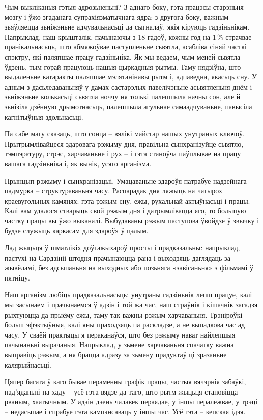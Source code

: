 Чым выкліканыя гэтыя адрозьненьні? З аднаго боку, гэта працэсы старэньня мозгу і ўжо згаданага супрахіязматычнага ядра; з другога боку, важным зьяўляецца зьніжэньне адчувальнасьці да сыгналаў, якія кіруюць гадзіньнікам. Напрыклад, наш крышталік, пачынаючы з 18 гадоў, кожны год на 1\,\% страчвае пранікальнасьць, што абмяжоўвае паступленьне сьвятла, асабліва сіняй часткі спэктру, які паляпшае працу гадзіньніка. Як мы ведаем, чым меней сьвятла ўдзень, тым горай працуюць нашыя цыркадныя рытмы. Таму нядзіўна, што выдаленьне катаракты паляпшае мэлятанінавы рытм і, адпаведна, якасьць сну. У адным з дасьледаваньняў у дамах састарэлых павелічэньне асьвятленьня днём і зьніжэньне колькасьці сьвятла ноччу ня толькі палепшыла начны сон, але й зьнізіла дзённую дрымотнасьць, палепшыла агульнае самаадчуваньне, павысіла кагнітыўныя здольнасьці.

Па сабе магу сказаць, што сонца – вялікі майстар нашых унутраных ключоў. Прытрымлівайцеся здаровага рэжыму дня, правільна сынхранізуйце сьвятло, тэмпэратуру, стрэс, харчаваньне і рух – і гэта станоўча паўплывае на працу вашага гадзіньніка і, як вынік, усяго арганізма.

Прынцып рэжыму і сынхранізацыі. Умацаваньне здароўя патрабуе надзейнага падмурка – структураваньня часу. Распарадак дня ляжыць на чатырох краевугольных камянях: гэта рэжым сну, ежы, рухальнай актыўнасьці і працы. Калі вам удалося стварыць свой рэжым дня і датрымлівацца яго, то большую частку працы вы ўжо выканалі. Выбудаваны рэжым паступова ўвойдзе ў звычку і будзе служыць каркасам для здароўя ў цэлым.

Лад жыцьця ў шматлікіх доўгажыхароў просты і прадказальны: напрыклад, пастухі на Сардзініі штодня прачынаюцца рана і выходзяць даглядаць за жывёламі, без адсыпаньня на выходных або позьняга «завісаньня» з фільмамі ў пятніцу.

Наш арганізм любіць прадказальнасьць: унутраны гадзіньнік лепш працуе, калі мы засынаем і прачынаемся ў адзін і той жа час, наш страўнік і кішачнік загадзя рыхтуюцца да прыёму ежы, таму так важны рэжым харчаваньня. Трэніроўкі больш эфэктыўныя, калі яны праходзяць па раскладзе, а не выпадкова час ад часу. У сваёй практыцы я пераканаўся, што без рэжыму нават найлепшыя пачынаньні вырачаныя. Напрыклад, у зьмене харчаваньня спачатку важна выправіць рэжым, а ня брацца адразу за зьмену прадуктаў ці зразаньне калярыйнасьці.

Цяпер багата ў каго бывае пераменны графік працы, частыя вячэрнія забаўкі, пад'яданьні на хаду – усё гэта вядзе да таго, што рытм жыцьця становіцца рваным, хаатычным. У адзін дзень чалавек пераядае, у іншы пералежвае, у трэці – недасыпае і спрабуе гэта кампэнсаваць у іншы час. Усё гэта – кепская ідэя. 


